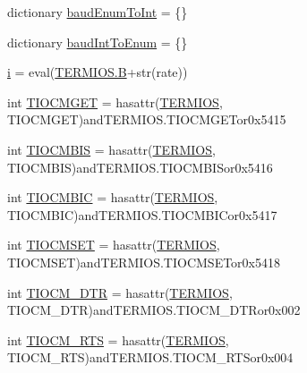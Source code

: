 \begin{DoxyCompactItemize}
\item 
dictionary \hyperlink{namespaceserial_1_1serialposix_a1855bda11053e332f5ad0dceca40b73b}{baud\+Enum\+To\+Int} = \{\}
\item 
dictionary \hyperlink{namespaceserial_1_1serialposix_a21ccb7e53208b3eee4b6dc87ed48d5e1}{baud\+Int\+To\+Enum} = \{\}
\item 
\hyperlink{namespaceserial_1_1serialposix_a0a55a600be14d50e8adc01088215bbb1}{i} = eval(\textquotesingle{}\hyperlink{adc16_8h_a111da81ae5883147168bbb8366377b10}{T\+E\+R\+M\+I\+O\+S.\+B}\textquotesingle{}+str(rate))
\item 
int \hyperlink{namespaceserial_1_1serialposix_a98ced6ed92112069444b366824052568}{T\+I\+O\+C\+M\+G\+ET} = hasattr(\hyperlink{namespaceserial_1_1serialposix_ad56e7a51b0acdb47ce56707e4b7560b8}{T\+E\+R\+M\+I\+OS}, \textquotesingle{}T\+I\+O\+C\+M\+G\+ET\textquotesingle{})and\+T\+E\+R\+M\+I\+O\+S.\+T\+I\+O\+C\+M\+G\+E\+Tor0x5415
\item 
int \hyperlink{namespaceserial_1_1serialposix_a8550ed18ae30f22650f58a9b19b9c0be}{T\+I\+O\+C\+M\+B\+IS} = hasattr(\hyperlink{namespaceserial_1_1serialposix_ad56e7a51b0acdb47ce56707e4b7560b8}{T\+E\+R\+M\+I\+OS}, \textquotesingle{}T\+I\+O\+C\+M\+B\+IS\textquotesingle{})and\+T\+E\+R\+M\+I\+O\+S.\+T\+I\+O\+C\+M\+B\+I\+Sor0x5416
\item 
int \hyperlink{namespaceserial_1_1serialposix_a7e20eafe4028f98d5e1c113d59234514}{T\+I\+O\+C\+M\+B\+IC} = hasattr(\hyperlink{namespaceserial_1_1serialposix_ad56e7a51b0acdb47ce56707e4b7560b8}{T\+E\+R\+M\+I\+OS}, \textquotesingle{}T\+I\+O\+C\+M\+B\+IC\textquotesingle{})and\+T\+E\+R\+M\+I\+O\+S.\+T\+I\+O\+C\+M\+B\+I\+Cor0x5417
\item 
int \hyperlink{namespaceserial_1_1serialposix_aae5eff0b04208edfd40f9c0ea5f8d306}{T\+I\+O\+C\+M\+S\+ET} = hasattr(\hyperlink{namespaceserial_1_1serialposix_ad56e7a51b0acdb47ce56707e4b7560b8}{T\+E\+R\+M\+I\+OS}, \textquotesingle{}T\+I\+O\+C\+M\+S\+ET\textquotesingle{})and\+T\+E\+R\+M\+I\+O\+S.\+T\+I\+O\+C\+M\+S\+E\+Tor0x5418
\item 
int \hyperlink{namespaceserial_1_1serialposix_a3671470f6e68d32ece2b66e4de3f6e1f}{T\+I\+O\+C\+M\+\_\+\+D\+TR} = hasattr(\hyperlink{namespaceserial_1_1serialposix_ad56e7a51b0acdb47ce56707e4b7560b8}{T\+E\+R\+M\+I\+OS}, \textquotesingle{}T\+I\+O\+C\+M\+\_\+\+D\+TR\textquotesingle{})and\+T\+E\+R\+M\+I\+O\+S.\+T\+I\+O\+C\+M\+\_\+\+D\+T\+Ror0x002
\item 
int \hyperlink{namespaceserial_1_1serialposix_aa1c828134bbab0d78000cf1e03f4eb71}{T\+I\+O\+C\+M\+\_\+\+R\+TS} = hasattr(\hyperlink{namespaceserial_1_1serialposix_ad56e7a51b0acdb47ce56707e4b7560b8}{T\+E\+R\+M\+I\+OS}, \textquotesingle{}T\+I\+O\+C\+M\+\_\+\+R\+TS\textquotesingle{})and\+T\+E\+R\+M\+I\+O\+S.\+T\+I\+O\+C\+M\+\_\+\+R\+T\+Sor0x004

\end{DoxyCompactItemize}
